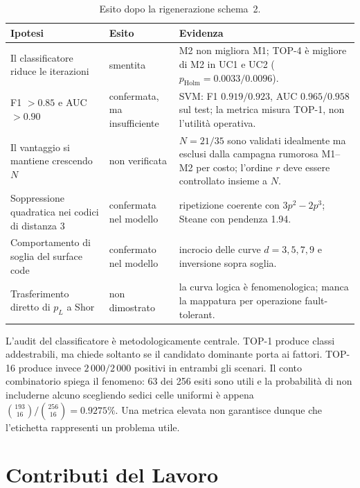 \begin{onehalfspace}
\begin{table}[H]
\centering
\small
\caption[Esito delle ipotesi]{Esito dopo la rigenerazione schema~2.}
\label{tab:esito_ipotesi}
\begin{tabular}{p{4.2cm}p{2.5cm}p{6.6cm}}
\toprule
\textbf{Ipotesi} & \textbf{Esito} & \textbf{Evidenza} \\
\midrule
Il classificatore riduce le iterazioni
& smentita
& M2 non migliora M1; TOP-4 è migliore di M2 in UC1 e UC2
($p_{\mathrm{Holm}}=0.0033/0.0096$). \\
\addlinespace
F1 $>0.85$ e AUC $>0.90$
& confermata, ma insufficiente
& SVM: F1 $0.919/0.923$, AUC $0.965/0.958$ sul test; la metrica
misura TOP-1, non l'utilità operativa. \\
\addlinespace
Il vantaggio si mantiene crescendo $N$
& non verificata
& $N=21/35$ sono validati idealmente ma esclusi dalla campagna rumorosa
M1--M2 per costo;
l'ordine $r$ deve essere controllato insieme a $N$. \\
\addlinespace
Soppressione quadratica nei codici di distanza 3
& confermata nel modello
& ripetizione coerente con $3p^2-2p^3$; Steane con pendenza 1.94. \\
\addlinespace
Comportamento di soglia del surface code
& confermato nel modello
& incrocio delle curve $d=3,5,7,9$ e inversione sopra soglia. \\
\addlinespace
Trasferimento diretto di $p_L$ a Shor
& non dimostrato
& la curva logica è fenomenologica; manca la mappatura per operazione
fault-tolerant. \\
\bottomrule
\end{tabular}
\end{table}

L'audit del classificatore è metodologicamente centrale. TOP-1 produce
classi addestrabili, ma chiede soltanto se il candidato dominante porta
ai fattori. TOP-16 produce invece $2\,000/2\,000$ positivi in entrambi
gli scenari. Il conto combinatorio spiega il fenomeno: 63 dei 256 esiti
sono utili e la probabilità di non includerne alcuno scegliendo sedici
celle uniformi è appena
$\binom{193}{16}/\binom{256}{16}=0.9275\%$. Una metrica elevata non
garantisce dunque che l'etichetta rappresenti un problema utile.

\section{Contributi del Lavoro}


\end{onehalfspace}
